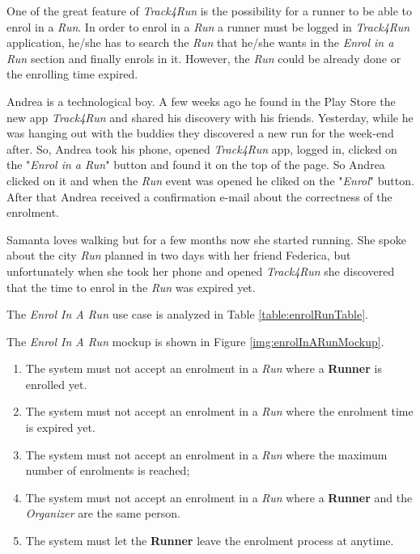 One of the great feature of \textit{Track4Run} is the possibility for a runner to be able to enrol in a \textit{Run}.
In order to enrol in a \textit{Run} a runner must be logged in \textit{Track4Run} application, he/she has to search the \textit{Run} that he/she wants in the \textit{Enrol in a Run} section and finally enrols in it.
However, the \textit{Run} could be already done or the enrolling time expired.

Andrea is a technological boy. A few weeks ago he found in the Play Store the new app \textit{Track4Run} and shared his discovery with his friends. Yesterday, while he was hanging out with the buddies they discovered a new run for the week-end after.
So, Andrea took his phone, opened \textit{Track4Run} app, logged in, clicked on the "\textit{Enrol in a Run}" button and found it on the top of the page. So Andrea clicked on it and when the \textit{Run} event was opened he cliked on the "\textit{Enrol}" button.
After that Andrea received a confirmation e-mail about the correctness of the enrolment.

Samanta loves walking but for a few months now she started running. She spoke about the city \textit{Run} planned in two days with her friend Federica, but unfortunately when she took her phone and opened \textit{Track4Run} she discovered that the time to enrol in the \textit{Run} was expired yet.

The \textit{Enrol In A Run} use case is analyzed in Table \ref{table:enrolRunTable}.

The \textit{Enrol In A Run} mockup is shown in Figure \ref{img:enrolInARunMockup}.

\begin{enumerate}
  \item The system must not accept an enrolment in a \textit{Run} where a \textbf{Runner} is enrolled yet.
  \item The system must not accept an enrolment in a \textit{Run} where the enrolment time is expired yet.
  \item The system must not accept an enrolment in a \textit{Run} where the maximum number of enrolments is reached;
  \item The system must not accept an enrolment in a \textit{Run} where a \textbf{Runner} and the \textit{Organizer} are the same person.
  \item The system must let the \textbf{Runner} leave the enrolment process at anytime.
\end{enumerate}

